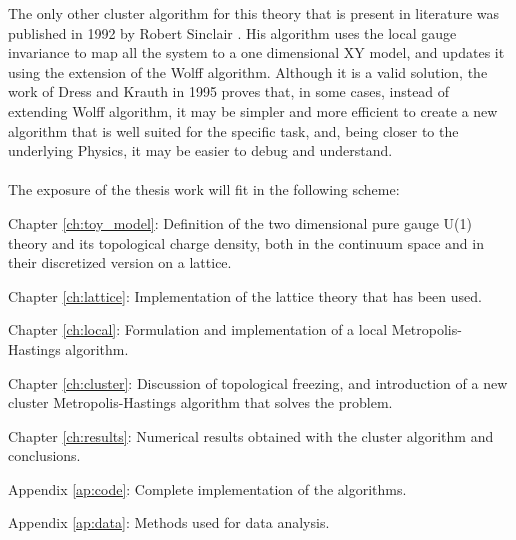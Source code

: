 The only other cluster algorithm for this theory that is present in literature was published in 1992 by Robert Sinclair \cite{sinclair:1992}.
His algorithm uses the local gauge invariance to map all the system to a one dimensional XY model, and updates it using the extension of the Wolff algorithm.
Although it is a valid solution, the work of Dress and Krauth in 1995 proves that, in some cases, instead of extending Wolff algorithm,
it may be simpler and more efficient to create a new algorithm that is well suited for the specific task, and, being closer to the underlying Physics,
it may be easier to debug and understand.
\ \\ \ \\
The exposure of the thesis work will fit in the following scheme:
\begin{description}
    \item{Chapter \ref{ch:toy_model}:} Definition of the two dimensional pure gauge U(1) theory and its topological charge density,
    both in the continuum space and in their discretized version on a lattice.
    \item{Chapter \ref{ch:lattice}:} Implementation of the lattice theory that has been used.
    \item{Chapter \ref{ch:local}:} Formulation and implementation of a local Metropolis-Hastings algorithm.
    \item{Chapter \ref{ch:cluster}:} Discussion of topological freezing, and introduction of a new cluster Metropolis-Hastings algorithm that solves the problem.
    \item{Chapter \ref{ch:results}:} Numerical results obtained with the cluster algorithm and conclusions.\\
    \item{Appendix \ref{ap:code}:} Complete implementation of the algorithms.
    \item{Appendix \ref{ap:data}:} Methods used for data analysis.
\end{description}

\endgroup

\vfill
